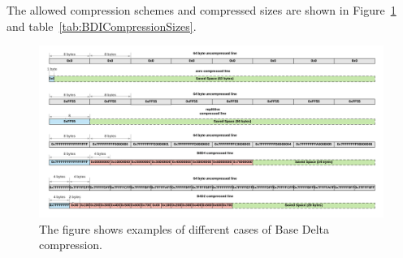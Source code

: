 The allowed compression schemes and compressed sizes are shown in Figure~\ref{fig:BaseDeltaCompression} and table~\ref{tab:BDICompressionSizes}.
\begin{figure}
    \includegraphics[width=\textwidth]{BaseDeltaCompression.pdf}
    \caption[Base Delta Compression Examples]{The figure shows examples of different cases of Base Delta compression.}
    \label{fig:BaseDeltaCompression}
\end{figure}
